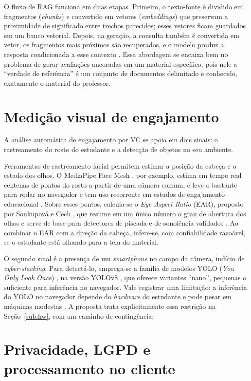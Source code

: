 \documentclass[portuguese,oneside]{tcc}
\begin{document}
O fluxo de RAG funciona em duas etapas. Primeiro, o texto-fonte é dividido em fragmentos (\emph{chunks}) e convertido em vetores (\emph{embeddings}) que preservam a proximidade de significado entre trechos parecidos; esses vetores ficam guardados em um banco vetorial. Depois, na geração, a consulta também é convertida em vetor, os fragmentos mais próximos são recuperados, e o modelo produz a resposta condicionada a esse contexto \cite{GXG23}. Essa abordagem se encaixa bem no problema de gerar avaliações ancoradas em um material específico, pois nele a ``verdade de referência'' é um conjunto de documentos delimitado e conhecido, exatamente o material do professor.

\section{\label{sub:vc}Medição visual de engajamento}

A análise automática de engajamento por VC se apoia em dois sinais: o rastreamento do rosto do estudante e a detecção de objetos no seu ambiente.

Ferramentas de rastreamento facial permitem estimar a posição da cabeça e o estado dos olhos. O MediaPipe Face Mesh \cite{LTN19,KAGG19}, por exemplo, estima em tempo real centenas de pontos do rosto a partir de uma câmera comum, é leve o bastante para rodar no navegador e tem uso recorrente em estudos de engajamento educacional \cite{AK24,DD25}. Sobre esses pontos, calcula-se o \emph{Eye Aspect Ratio} (EAR), proposto por Soukupová e Cech \cite{SC16}, que resume em um único número o grau de abertura dos olhos e serve de base para detectores de piscada e de sonolência validados \cite{MdCMSL20}. Ao combinar o EAR com a direção da cabeça, infere-se, com confiabilidade razoável, se o estudante está olhando para a tela do material.

O segundo sinal é a presença de um \emph{smartphone} no campo da câmera, indício de \emph{cyber-slacking}. Para detectá-lo, emprega-se a família de modelos YOLO (\emph{You Only Look Once}) \cite{RDGF16}, na versão YOLOv8 \cite{JCQ23}, que oferece variantes ``nano'', pequenas o suficiente para inferência no navegador. Vale registrar uma limitação: a inferência do YOLO no navegador depende do \emph{hardware} do estudante e pode pesar em máquinas modestas \cite{JCQ23}. A proposta trata explicitamente essa restrição na Seção~\ref{sub:hw}, com um caminho de contingência.

\section{\label{sub:priv}Privacidade, LGPD e processamento no cliente}
\end{document}
